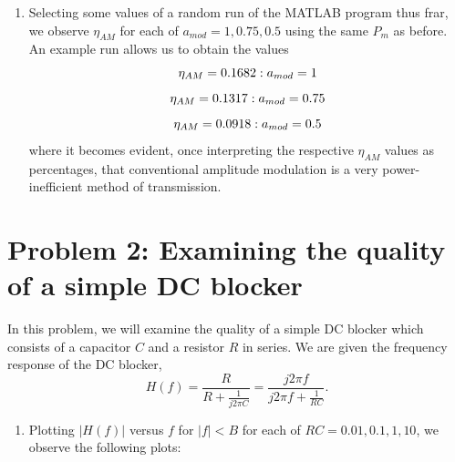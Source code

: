 \documentclass[11pt]{article}
\begin{document}
\begin{enumerate}[label=\textbf{\alph*)}, leftmargin=2.6em]
    \item Selecting some values of a random run of the MATLAB program thus frar,
    we observe $\eta_{AM}$ for each of $a_{mod}=1, 0.75, 0.5$ using
    the same $P_m$ as before. An example run allows us to obtain the values\\
    \begin{equation} \notag
        \eta_{AM} = 0.1682 : a_{mod} = 1
    \end{equation} 
    \begin{equation} \notag
        \eta_{AM} = 0.1317 : a_{mod} = 0.75
    \end{equation} 
    \begin{equation} \notag
        \eta_{AM} = 0.0918 : a_{mod} = 0.5
    \end{equation} 
    where it becomes evident, once interpreting the respective $\eta_{AM}$ values
    as percentages, that conventional amplitude modulation is a very power-inefficient
    method of transmission.

\end{enumerate}

\section{Problem 2: Examining the quality of a simple DC blocker}
In this problem, we will examine the quality of a simple DC blocker which consists
of a capacitor $C$ and a resistor $R$ in series. We are given the frequency response
of the DC blocker,
\begin{equation}
    H(f) = \frac{R}{R+\frac{1}{j2\pi C}} = \frac{j2\pi f}{j2\pi f + \frac{1}{RC}}.
\end{equation}

\begin{enumerate}[label=\textbf{\alph*)}, leftmargin=2.6em]
    \item Plotting $|H(f)|$ versus $f$ for $|f|<B$ for each of $RC=0.01,0.1,1,10$, we
    observe the following plots:
\end{enumerate}
\end{document}
